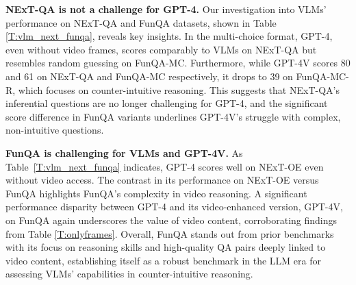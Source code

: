 % 

\noindent\textbf{NExT-QA is not a challenge for GPT-4.}\quad
Our investigation into VLMs' performance on NExT-QA and FunQA datasets, shown in Table \ref{T:vlm_next_funqa}, reveals key insights. In the multi-choice format, GPT-4, even without video frames, scores comparably to VLMs on NExT-QA but resembles random guessing on FunQA-MC. Furthermore, while GPT-4V scores 80 and 61 on NExT-QA and FunQA-MC respectively, it drops to 39 on FunQA-MC-R, which focuses on counter-intuitive reasoning. This suggests that NExT-QA's inferential questions are no longer challenging for GPT-4, and the significant score difference in FunQA variants underlines GPT-4V's struggle with complex, non-intuitive questions.

\noindent\textbf{FunQA is challenging for VLMs and GPT-4V.}\quad
As Table~\ref{T:vlm_next_funqa} indicates, GPT-4 scores well on NExT-OE even without video access. The contrast in its performance on NExT-OE versus FunQA highlights FunQA's complexity in video reasoning. A significant performance disparity between GPT-4 and its video-enhanced version, GPT-4V, on FunQA again underscores the value of video content, corroborating findings from Table \ref{T:onlyframes}. Overall, FunQA stands out from prior benchmarks with its focus on reasoning skills and high-quality QA pairs deeply linked to video content, establishing itself as a robust benchmark in the LLM era for assessing VLMs' capabilities in counter-intuitive reasoning.

